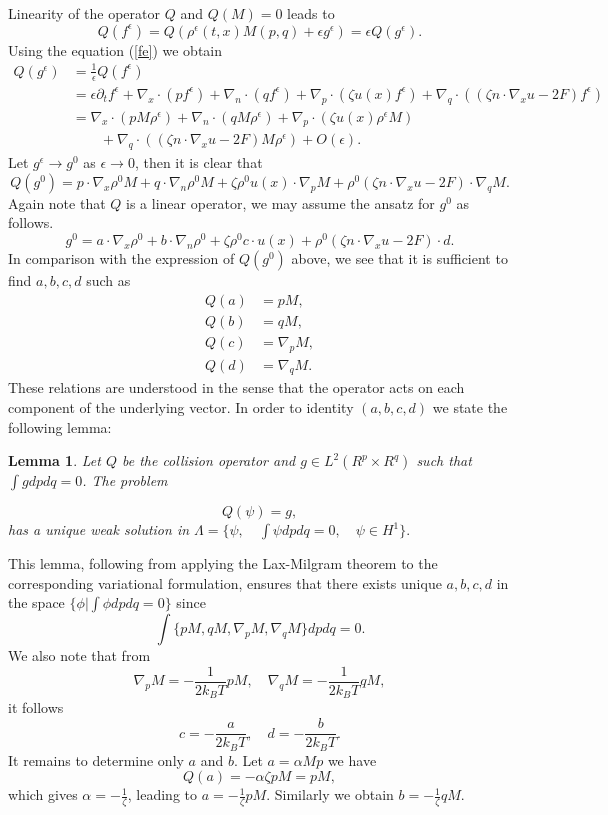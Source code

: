 \documentclass[reqno]{amsart}
\numberwithin{equation}{section}
\newtheorem{Lemma}{Lemma}[section]
\theoremstyle{definition}
\theoremstyle{remark}
\begin{document}
Linearity of the operator $Q$ and $Q(M)=0$ leads to
$$
Q(f^\epsilon)=Q(\rho^\epsilon(t, x)M(p, q)+\epsilon
g^\epsilon)=\epsilon Q(g^\epsilon).
$$
Using the equation (\ref{fe}) we obtain
\begin{align*}
Q(g^\epsilon) &=\frac{1}{\epsilon} Q(f^\epsilon)\\
& =\epsilon \partial_t f^\epsilon +
\nabla_x\cdot(pf^\epsilon)+\nabla_n\cdot(qf^\epsilon)+
\nabla_p\cdot(\zeta u(x)f^\epsilon)+ \nabla_q\cdot((\zeta n\cdot
\nabla_x u-2F)f^\epsilon)\\
& =\nabla_x\cdot(pM\rho^\epsilon )+\nabla_n\cdot(qM\rho^\epsilon)+
\nabla_p\cdot(\zeta u(x) \rho^\epsilon M)\\
& \qquad + \nabla_q\cdot((\zeta n\cdot \nabla_x u-2F)M\rho^\epsilon)
+O(\epsilon).
\end{align*}
Let $g^\epsilon \to g^0$ as $\epsilon \to 0$, then it is clear that
$$
Q(g^0)=p\cdot \nabla_x \rho^0 M+ q\cdot \nabla_n \rho^0 M +\zeta
\rho^0 u(x) \cdot \nabla_p M +\rho^0 (\zeta n\cdot \nabla_xu -2F)\cdot
\nabla_q M.
$$
Again note that  $Q$ is a linear operator, we may assume the
ansatz for $g^0$ as follows.
$$
g^0=a\cdot \nabla_x \rho^0 +b\cdot \nabla_n \rho^0+\zeta \rho^0
c\cdot u(x) +\rho^0 (\zeta n\cdot \nabla_xu -2F)\cdot d.
$$
In comparison with the expression of $Q(g^0)$ above, we see that it
is sufficient to find $a, b, c, d$ such as
\begin{align*}
Q(a)& =pM, \\
Q(b)&=qM,\\
Q(c)&=\nabla_p M,\\
Q(d) &=\nabla_q M.
\end{align*}
These relations are understood in the sense that the operator acts
on each component of the underlying vector. In order to identity
$(a, b, c, d)$ we state the following lemma:
\begin{Lemma} Let $Q$ be the collision operator and $g \in L^2(R^p\times R^q)$ such that
$\int g dpdq=0$. The problem

\begin{equation}\label{fg}
    Q(\psi)=g,
\end{equation}
has a unique weak solution in $\Lambda=\{\psi, \quad \int \psi
dpdq=0, \quad \psi \in  H^1 \}. $
\end{Lemma}
This lemma,  following from applying the Lax-Milgram theorem to the
corresponding variational formulation, ensures that there exists
unique $a, b, c, d$ in the space $\{\phi|\int \phi dpdq=0\}$ since
$$
\int \{pM, qM, \nabla_p M, \nabla_q M\}dpdq=0.
$$
We also note that from
$$
\nabla_p M= -\frac{1}{2k_BT}pM, \quad \nabla_q M= -\frac{1}{2k_BT}qM,
$$
it follows
$$
c=-\frac{a}{2k_BT}, \quad d=-\frac{b}{2k_BT}.
$$
It remains to determine only $a$ and $b$. Let $a=\alpha Mp$ we have
$$
Q(a)=-\alpha \zeta pM=pM,
$$
which gives $\alpha =-\frac{1}{\zeta}$, leading to  $a=-\frac{1}{\zeta}pM$. Similarly we obtain $b=-\frac{1}{\zeta} qM$.
\end{document}
